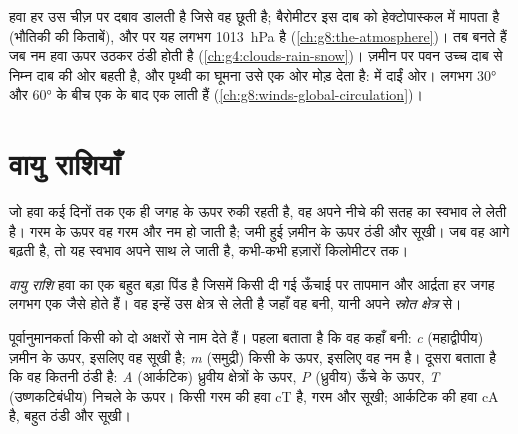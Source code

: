 \begin{recall}
हवा हर उस चीज़ पर दबाव डालती है जिसे वह छूती है; बैरोमीटर इस दाब को हेक्टोपास्कल में
मापता है (भौतिकी की किताबें), और  पर यह लगभग \qty{1013}{hPa} है
(\cref{ch:g8:the-atmosphere})।  तब बनते हैं जब नम हवा ऊपर उठकर ठंडी होती है
(\cref{ch:g4:clouds-rain-snow})। ज़मीन पर पवन उच्च दाब से निम्न दाब की ओर बहती है,
और पृथ्वी का घूमना उसे एक ओर मोड़ देता है:  में दाईं ओर। लगभग \ang{30}
और \ang{60} के बीच  एक के बाद एक  लाती हैं
(\cref{ch:g8:winds-global-circulation})।
\end{recall}

\section{वायु राशियाँ}

जो हवा कई दिनों तक एक ही जगह के ऊपर रुकी रहती है, वह अपने नीचे की सतह का स्वभाव ले
लेती है। गरम  के ऊपर वह गरम और नम हो जाती है; जमी हुई ज़मीन के ऊपर ठंडी और
सूखी। जब वह आगे बढ़ती है, तो यह स्वभाव अपने साथ ले जाती है, कभी-कभी हज़ारों किलोमीटर
तक।

\begin{definition}[वायु राशि]\label{def:g8:fronts-and-weather-maps:air-mass}
\emph{वायु राशि} हवा का एक बहुत बड़ा पिंड है जिसमें किसी दी गई
ऊँचाई पर तापमान और आर्द्रता हर जगह लगभग एक जैसे होते हैं। वह इन्हें उस क्षेत्र से
लेती है जहाँ वह बनी, यानी अपने \emph{स्रोत
क्षेत्र} से।
\end{definition}

पूर्वानुमानकर्ता किसी  को दो अक्षरों से नाम देते हैं। पहला बताता है कि वह कहाँ
बनी: \emph{c} (महाद्वीपीय) ज़मीन के ऊपर, इसलिए वह सूखी है; \emph{m} (समुद्री)
किसी  के ऊपर, इसलिए वह नम है। दूसरा बताता है कि वह कितनी ठंडी है: \emph{A}
(आर्कटिक) ध्रुवीय क्षेत्रों के ऊपर, \emph{P} (ध्रुवीय) ऊँचे  के ऊपर,
\emph{T} (उष्णकटिबंधीय) निचले  के ऊपर। किसी गरम  की हवा cT है, गरम
और सूखी; आर्कटिक की हवा cA है, बहुत ठंडी और
सूखी।

